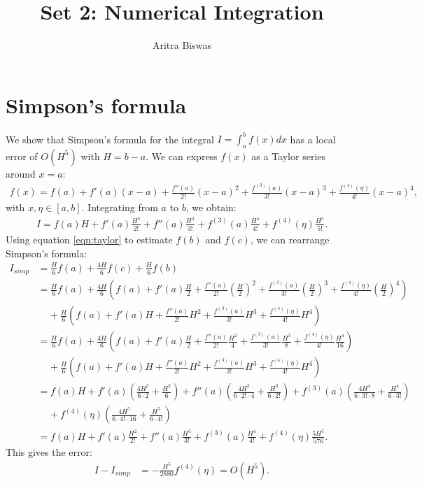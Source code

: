\documentclass{article}
\title{\textbf{Set 2: Numerical Integration}}
\date{}
\author{Aritra Biswas}
\theoremstyle{definition}
\renewcommand{\>}{\rangle}
\newcommand{\<}{\langle}
\begin{document}
\maketitle

\section{Simpson's formula}

We show that Simpson's formula for the integral
$I=\int_a^b f(x) dx$ has a local error of $O(H^5)$ with $H=b-a$. We can
express $f(x)$ as a Taylor series around $x=a$:
\begin{align}\label{eqn:taylor}
f(x) = f(a) + f'(a)(x-a) + \frac{f''(a)}{2!}(x-a)^2
+ \frac{f^{(3)}(a)}{3!}(x-a)^3
+ \frac{f^{(4)}(\eta)}{4!}(x-a)^4,
\end{align}
with $x,\eta\in[a,b]$. Integrating from $a$ to $b$, we obtain:
\begin{align*}
I = f(a)H + f'(a)\frac{H^2}{2!} + f''(a)\frac{H^3}{3!} +
f^{(3)}(a)\frac{H^4}{4!} + f^{(4)}(\eta)\frac{H^5}{5!}.
\end{align*}
Using equation \ref{eqn:taylor} to estimate $f(b)$ and $f(c)$, we can
rearrange Simpson's formula:
\begin{align*}
I_{simp} &= \frac{H}{6}f(a) + \frac{4H}{6}f(c) + \frac{H}{6}f(b) \\
&= \frac{H}{6}f(a) 
+ \frac{4H}{6}\left(f(a) + f'(a)\frac{H}{2} + \frac{f''(a)}{2!}\left(\frac{H}{2}\right)^2
+ \frac{f^{(3)}(a)}{3!}\left(\frac{H}{2}\right)^3
+ \frac{f^{(4)}(\eta)}{4!}\left(\frac{H}{2}\right)^4\right) \\
&\;\;\;\;+ \frac{H}{6}\left(
f(a) + f'(a)H + \frac{f''(a)}{2!}H^2
+ \frac{f^{(3)}(a)}{3!}H^3
+ \frac{f^{(4)}(\eta)}{4!}H^4\right) \\
&= \frac{H}{6}f(a) 
+ \frac{4H}{6}\left(f(a) + f'(a)\frac{H}{2} + \frac{f''(a)}{2!}\frac{H^2}{4}
+ \frac{f^{(3)}(a)}{3!}\frac{H^3}{8}
+ \frac{f^{(4)}(\eta)}{4!}\frac{H^4}{16}\right) \\
&\;\;\;\;+ \frac{H}{6}\left(
f(a) + f'(a)H + \frac{f''(a)}{2!}H^2
+ \frac{f^{(3)}(a)}{3!}H^3
+ \frac{f^{(4)}(\eta)}{4!}H^4\right) \\
&= f(a)H + f'(a)\left(\frac{4H^2}{6\cdot2}+\frac{H^2}{6}\right)
+ f''(a)\left(\frac{4H^3}{6\cdot2!\cdot4} + \frac{H^3}{6\cdot2!}\right)
+ f^{(3)}(a)\left(\frac{4H^4}{6\cdot3!\cdot8}+\frac{H^4}{6\cdot3!}\right) \\
&\;\;\;\;+ f^{(4)}(\eta)\left(\frac{4H^5}{6\cdot4!\cdot16}+\frac{H^5}{6\cdot4!}\right) \\
&= f(a)H + f'(a)\frac{H^2}{2!} + f''(a)\frac{H^3}{3!}
+ f^{(3)}(a)\frac{H^4}{4!} + f^{(4)}(\eta)\frac{5H^5}{576}.
\end{align*}
This gives the error:
\begin{align*}
I - I_{simp} &= -\frac{H^5}{2880}f^{(4)}(\eta) = O(H^5).
\end{align*}
\end{document}
